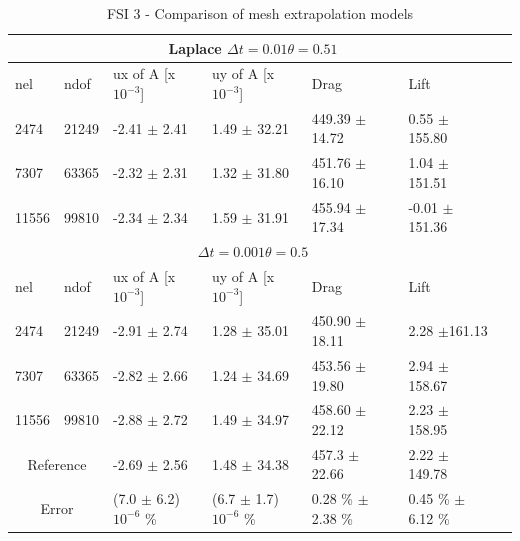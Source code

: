 \begin{table}[h!]
\centering
\caption{FSI 3 - Comparison of mesh extrapolation models}
\label{my-label}
\begin{tabular}{ |p{1cm}||p{1cm}|p{3.2cm}|p{3.2cm}|p{2.9cm}|p{3.1cm}|p{1.2cm}|}
 \hline
  \multicolumn{6}{|c|}{Laplace \hspace{2mm} $\Delta t = 0.01 \theta = 0.51$} \\
   \hline
nel & ndof & ux of A [x $10^{-3}$]  &uy of A [x $10^{-3}$]& Drag  & Lift \\
 \hline
 2474    & 21249  & -2.41 $\pm$   2.41 & 1.49     $\pm$   32.21 & 449.39       $\pm$   14.72 & 0.55 $\pm$   155.80  \\
 7307    & 63365  & -2.32    $\pm$   2.31 & 1.32 $\pm$    31.80 & 451.76  $\pm$   16.10 & 1.04      $\pm$   151.51  \\
 11556   & 99810  & -2.34  $\pm$   2.34  & 1.59   $\pm$  31.91 & 455.94       $\pm$ 17.34 & -0.01   $\pm$   151.36 \\
 \hline
  \multicolumn{6}{|c|}{$\Delta t = 0.001 \theta = 0.5$} \\
   \hline
 nel & ndof & ux of A [x $10^{-3}$]  &uy of A [x $10^{-3}$]& Drag  & Lift \\
    \hline
 2474    & 21249  & -2.91     $\pm$   2.74 & 1.28   $\pm$   35.01 & 450.90      $\pm$  18.11 & 2.28       $\pm$161.13 \\
 7307    & 63365  & -2.82    $\pm$   2.66& 1.24     $\pm$   34.69 & 453.56       $\pm$ 19.80 & 2.94     $\pm$ 158.67 \\
 11556   & 99810  & -2.88     $\pm$   2.72 & 1.49   $\pm$ 34.97 & 458.60   $\pm$ 22.12 & 2.23    $\pm$ 158.95 \\
 \hline
  \multicolumn{2}{|c|}{Reference} & -2.69 $\pm$  2.56                    & 1.48  $\pm$  34.38                   & 457.3  $\pm$  22.66        & 2.22  $\pm$ 149.78           \\
  \hline
    \multicolumn{2}{|c|}{Error}  & (7.0 $\pm$ 6.2)$10^{-6}$  \% & (6.7 $\pm$ 1.7)$10^{-6}$  \% & 0.28 \% $\pm$ 2.38 \% & 0.45 \% $\pm$ 6.12 \%\\
   \hline
\end{tabular}
\end{table}

